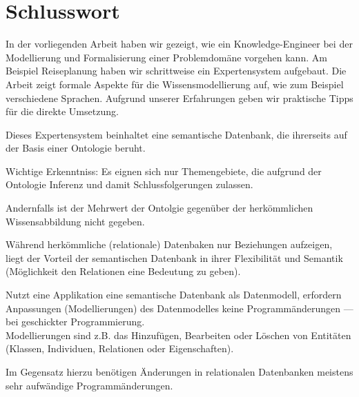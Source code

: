 \chapter{Schlusswort}
\label{chap:schlusswort}

In der vorliegenden Arbeit haben wir gezeigt, wie ein Knowledge-Engineer bei der Modellierung und Formalisierung einer Problemdomäne vorgehen kann. Am Beispiel Reiseplanung haben wir schrittweise ein Expertensystem aufgebaut. Die Arbeit zeigt formale Aspekte für die Wissensmodellierung auf, wie zum Beispiel verschiedene Sprachen. Aufgrund unserer Erfahrungen geben wir praktische Tipps für die direkte Umsetzung. 


Dieses Expertensystem beinhaltet eine semantische Datenbank, die ihrerseits auf der Basis einer Ontologie beruht.

Wichtige Erkenntniss: Es eignen sich nur Themengebiete, die aufgrund der Ontologie Inferenz und damit Schlussfolgerungen zulassen.

Andernfalls ist der Mehrwert der Ontolgie gegenüber der herkömmlichen Wissensabbildung nicht gegeben.

Während herkömmliche (relationale) Datenbaken nur Beziehungen aufzeigen, liegt der Vorteil der semantischen Datenbank in ihrer Flexibilität und Semantik (Möglichkeit den Relationen eine Bedeutung zu geben).

Nutzt eine Applikation eine semantische Datenbank als Datenmodell, erfordern Anpassungen (Modellierungen) des Datenmodelles keine Programmänderungen --- bei geschickter Programmierung.\\
Modellierungen sind z.B. das Hinzufügen, Bearbeiten oder Löschen von Entitäten (Klassen, Individuen, Relationen oder Eigenschaften).

Im Gegensatz hierzu benötigen Änderungen in relationalen Datenbanken meistens sehr aufwändige Programmänderungen.
